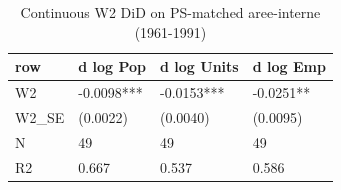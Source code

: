 \begin{table}

\caption{Continuous W2 DiD on PS-matched aree-interne (1961-1991)}
\centering
\begin{tabular}[t]{llll}
\toprule
row & d log Pop & d log Units & d log Emp\\
\midrule
W2 & -0.0098*** & -0.0153*** & -0.0251**\\
W2\_SE & (0.0022) & (0.0040) & (0.0095)\\
N & 49 & 49 & 49\\
R2 & 0.667 & 0.537 & 0.586\\
\bottomrule
\end{tabular}
\end{table}
